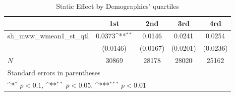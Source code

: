 \begin{table}[htbp]\centering
\def\sym#1{\ifmmode^{#1}\else\(^{#1}\)\fi}
\caption{Static Effect by Demographics' quartiles}
\begin{tabular}{l*{4}{c}}
\hline\hline
            &\multicolumn{1}{c}{1st}&\multicolumn{1}{c}{2nd}&\multicolumn{1}{c}{3rd}&\multicolumn{1}{c}{4rd}\\
\hline
sh\_mww\_wmean1\_st\_qtl&      0.0373\sym{**} &      0.0146         &      0.0241         &      0.0254         \\
            &    (0.0146)         &    (0.0167)         &    (0.0201)         &    (0.0236)         \\
\hline
\(N\)       &       30869         &       28178         &       28020         &       25162         \\
\hline\hline
\multicolumn{5}{l}{\footnotesize Standard errors in parentheses}\\
\multicolumn{5}{l}{\footnotesize \sym{*} \(p<0.1\), \sym{**} \(p<0.05\), \sym{***} \(p<0.01\)}\\
\end{tabular}
\end{table}
